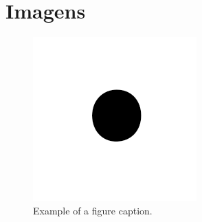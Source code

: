 \section{Imagens}
\begin{figure}[htbp]
    \centerline{
        \includegraphics*[scale=1.5]{imagens/fig1.png} 
        }
\caption{Example of a figure caption.}
\label{fig}
\end{figure}
